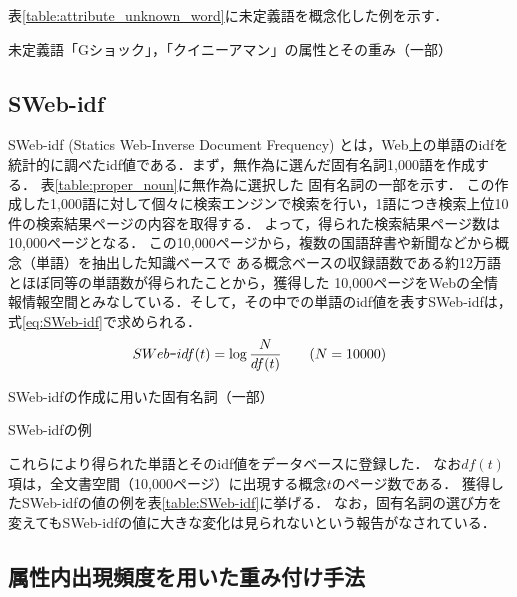 \documentclass[japanese]{jnlp_1.4}
\begin{document}
表\ref{table:attribute_unknown_word}に未定義語を概念化した例を示す．

\begin{table}[t]
\caption{未定義語「Gショック」，「クイニーアマン」の属性とその重み（一部）}
\label{table:attribute_unknown_word}

\vspace{-1\baselineskip}
\end{table}


\subsection{SWeb-idf}
\label{SWeb-idf}

SWeb-idf (Statics Web-Inverse Document Frequency) とは，Web上の単語のidfを統計的に調べたidf値である．まず，無作為に選んだ固有名詞1,000語を作成する．
表\ref{table:proper_noun}に無作為に選択した
固有名詞の一部を示す．
この作成した1,000語に対して個々に検索エンジンで検索を行い，1語につき検索上位10件の検索結果ページの内容を取得する．
よって，得られた検索結果ページ数は10,000ページとなる．
この10,000ページから，複数の国語辞書や新聞などから概念（単語）を抽出した知識ベースで
ある概念ベースの収録語数である約12万語とほぼ同等の単語数が得られたことから，獲得した
10,000ページをWebの全情報情報空間とみなしている．そして，その中での単語のidf値を表すSWeb-idfは，式\ref{eq:SWeb-idf}で求められる．
\begin{equation}
 SWeb \verb|-| idf(t)=\log\frac{N}{df(t)}\hspace{2em}(N=10000)\label{eq:SWeb-idf}
\end{equation}


\begin{table}[b]
\begin{minipage}[t]{0.6\textwidth}
\caption{SWeb-idfの作成に用いた固有名詞（一部）}
\label{table:proper_noun}

\end{minipage}
\begin{minipage}[t]{0.3\textwidth}
\caption{SWeb-idfの例}
\label{table:SWeb-idf}

\end{minipage}
\end{table}

これらにより得られた単語とそのidf値をデータベースに登録した．
なお$df(t)$項は，全文書空間（10,000ページ）に出現する概念$t$のページ数である．
獲得したSWeb-idfの値の例を表\ref{table:SWeb-idf}に挙げる．
なお，固有名詞の選び方を変えてもSWeb-idfの値に大きな変化は見られないという報告がなされている\cite{tuji:04}．


\subsection{属性内出現頻度を用いた重み付け手法}
\end{document}
